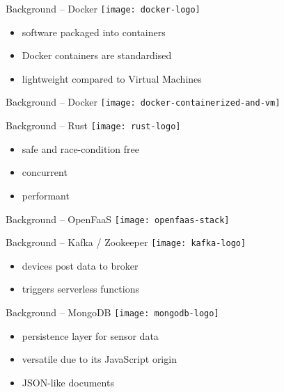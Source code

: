 \begin{frame}{Background -- Docker}
  \texttt{[image: docker-logo]}

  \vspace*{1.5em}

  \begin{itemize}
    \item software packaged into containers
    \item Docker containers are standardised
    \item lightweight compared to Virtual Machines
  \end{itemize}
\end{frame}

\begin{frame}{Background -- Docker}
  \vfill
  \texttt{[image: docker-containerized-and-vm]}
\end{frame}

\begin{frame}{Background -- Rust}
  \texttt{[image: rust-logo]}

  \vspace*{1.5em}

  \begin{itemize}
    \item safe and race-condition free
    \item concurrent
    \item performant
  \end{itemize}
\end{frame}

\begin{frame}{Background -- OpenFaaS}
  \texttt{[image: openfaas-stack]}
\end{frame}

\begin{frame}{Background -- Kafka / Zookeeper}
  \texttt{[image: kafka-logo]}

  \vspace*{1.5em}

  \begin{itemize}
    \item devices post data to broker
    \item triggers serverless functions
  \end{itemize}
\end{frame}

\begin{frame}{Background -- MongoDB}
  \texttt{[image: mongodb-logo]}

  \vspace*{1.5em}

  \begin{itemize}
    \item persistence layer for sensor data
    \item versatile due to its JavaScript origin
    \item JSON-like documents
  \end{itemize}
\end{frame}

